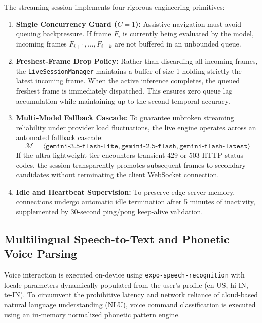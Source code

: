 \documentclass[10pt,a4paper]{article}
\begin{document}
The streaming session implements four rigorous engineering primitives:
\begin{enumerate}
    \item \textbf{Single Concurrency Guard ($C=1$):} Assistive navigation must avoid queuing backpressure. If frame $F_{i}$ is currently being evaluated by the model, incoming frames $F_{i+1}, \dots, F_{i+k}$ are not buffered in an unbounded queue.
    \item \textbf{Freshest-Frame Drop Policy:} Rather than discarding all incoming frames, the \texttt{LiveSessionManager} maintains a buffer of size 1 holding strictly the latest incoming frame. When the active inference completes, the queued freshest frame is immediately dispatched. This ensures zero queue lag accumulation while maintaining up-to-the-second temporal accuracy.
    \item \textbf{Multi-Model Fallback Cascade:} To guarantee unbroken streaming reliability under provider load fluctuations, the live engine operates across an automated fallback cascade:
    \begin{equation}
        \mathcal{M} = \langle \texttt{gemini-3.5-flash-lite}, \texttt{gemini-2.5-flash}, \texttt{gemini-flash-latest} \rangle
    \end{equation}
    If the ultra-lightweight tier encounters transient 429 or 503 HTTP status codes, the session transparently promotes subsequent frames to secondary candidates without terminating the client WebSocket connection.
    \item \textbf{Idle and Heartbeat Supervision:} To preserve edge server memory, connections undergo automatic idle termination after 5 minutes of inactivity, supplemented by 30-second ping/pong keep-alive validation.
\end{enumerate}

\subsection{Multilingual Speech-to-Text and Phonetic Voice Parsing}
Voice interaction is executed on-device using \texttt{expo-speech-recognition} with locale parameters dynamically populated from the user's profile ($\text{en-US}$, $\text{hi-IN}$, $\text{te-IN}$). To circumvent the prohibitive latency and network reliance of cloud-based natural language understanding (NLU), voice command classification is executed using an in-memory normalized phonetic pattern engine.
\end{document}

